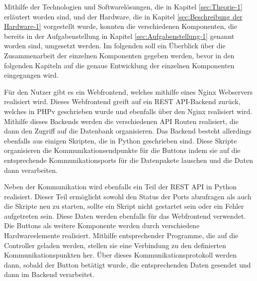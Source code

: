 Mithilfe der Technologien und Softwarelösungen, die in Kapitel \ref{sec:Theorie-1} erläutert worden sind, und der Hardware, die in Kapitel \ref{sec:Beschreibung der Hardware-1} vorgestellt wurde, konnten die verschiedenen Komponenten, die bereits in der Aufgabenstellung in Kapitel \ref{sec:Aufgabenstellung-1} genannt worden sind, umgesetzt werden. 
Im folgenden soll ein Überblick über die Zusammenarbeit der einzelnen Komponenten gegeben werden, bevor in den folgenden Kapiteln auf die genaue Entwicklung der einzelnen Komponenten eingegangen wird. 

Für den Nutzer gibt es ein Webfrontend, welches mithilfe eines Nginx Webservers realisiert wird. Dieses Webfrontend greift auf ein \ac{REST} \ac{API}-Backend zurück, welches in \ac{PHP}v geschrieben wurde und ebenfalls über den Nginx realisiert wird. Mithilfe dieses Backends werden die verschiedenen API Routen realisiert, die dann den Zugriff auf die Datenbank organisieren. Das Backend besteht allerdings ebenfalls aus einigen Skripten, die in Python geschrieben sind. Diese Skripte organisieren die Kommunikationsendpunkte für die Buttons indem sie auf die entsprechende Kommunikationsports für die Datenpakete lauschen und die Daten dann verarbeiten. 

Neben der Kommunikation wird ebenfalls ein Teil der \ac{REST} \ac{API} in Python realisiert. Dieser Teil ermöglicht sowohl den Status der Ports abzufragen als auch die Skripte neu zu starten, sollte ein Skript nicht gestartet sein oder ein Fehler aufgetreten sein. Diese Daten werden ebenfalls für das Webfrontend verwendet. 
Die Buttons als weitere Komponente werden durch verschiedene Hardwareelemente realisiert. Mithilfe entsprechender Programme, die auf die Controller geladen werden, stellen sie eine Verbindung zu den definierten Kommunikationspunkten her. Über dieses Kommunikationsprotokoll werden dann, sobald der Button betätigt wurde, die entsprechenden Daten gesendet und dann im Backend verarbeitet. 
